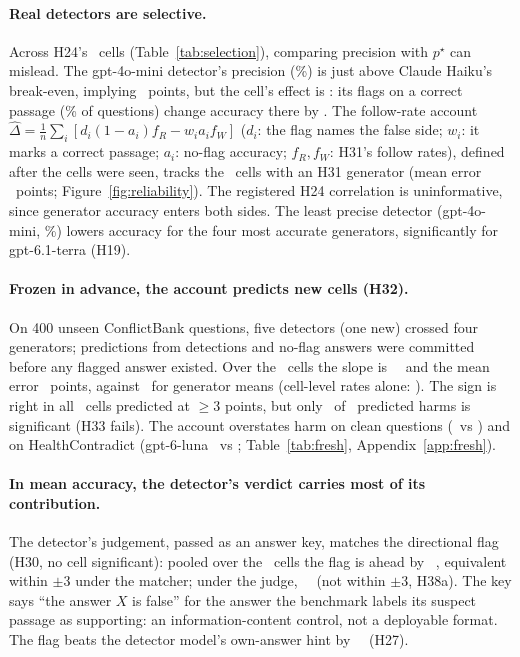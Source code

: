 \paragraph{Real detectors are selective.} Across H24's \hTwentyFourCells\ cells
(Table~\ref{tab:selection}), comparing precision with $p^\star$ can mislead. The gpt-4o-mini detector's precision
(\selHaikuMiniPrec\%) is just above Claude Haiku's break-even, implying \selHaikuMiniMarg\ points, but the cell's effect is
\selHaikuMiniObs: its flags on a correct passage (\selHaikuMiniWrongShare\% of questions) change accuracy there by
\selHaikuMiniWrongGain. The follow-rate account
$\hat\Delta=\frac1n\sum_i[d_i(1-a_i)f_R-w_ia_if_W]$ ($d_i$: the flag names the false side; $w_i$: it marks a correct
passage; $a_i$: no-flag accuracy; $f_R,f_W$: H31's follow rates), defined after the cells were seen, tracks the
\predEightN\ cells with an H31 generator (mean error \predEightMae\ points; Figure~\ref{fig:reliability}).
The registered H24 correlation is uninformative, since generator accuracy enters both sides. The least precise detector (gpt-4o-mini, \dirPrecMini\%) lowers accuracy for the four most
accurate generators, significantly for gpt-6.1-terra (H19).

\paragraph{Frozen in advance, the account predicts new cells (H32).} On 400 unseen ConflictBank questions, five
detectors (one new) crossed four generators; predictions from detections and no-flag answers were committed before
any flagged answer existed. Over the \frN\ cells the slope is \frSlope\ \frSlopeCI\ and the mean error \frMae\
points, against \frMaeGen\ for generator means (cell-level rates alone: \frMaeMarg). The sign is right in all
\frBigN\ cells predicted at $\ge$3 points, but only \frHarmConf\ of \frHarmN\ predicted harms is significant (H33 fails). The account overstates harm on clean questions (\frCleanPred\ vs \frCleanObs) and
on HealthContradict (gpt-6-luna \hcLlmPredLuna\ vs \hcLlmLuna; Table~\ref{tab:fresh}, Appendix~\ref{app:fresh}).

\paragraph{In mean accuracy, the detector's verdict carries most of its contribution.} The detector's judgement, passed as an answer key,
matches the directional flag (H30, no cell significant): pooled over the \PoolThirtyAK\ cells the flag
is ahead by \PoolThirtyA\ \PoolThirtyACI, equivalent within $\pm$3 under the matcher; under the judge,
\jdThirtyJ\ \jdThirtyJCI\ (not within $\pm$3, H38a). The key says ``the
answer $X$ is false'' for the answer the benchmark labels its suspect passage as supporting: an information-content
control, not a deployable format. The flag beats the detector model's own-answer
hint by \PoolThirtyB\ \PoolThirtyBCI\ (H27).

